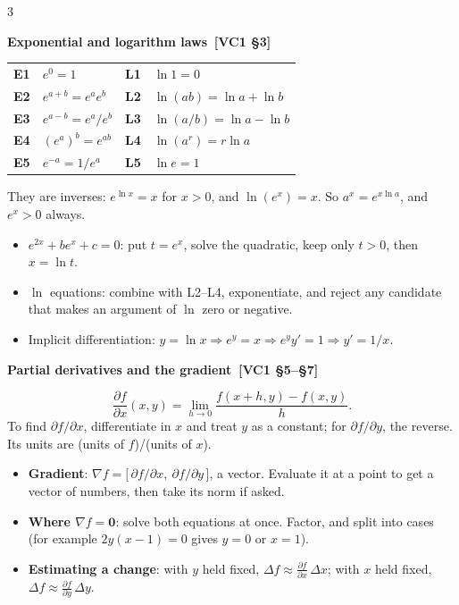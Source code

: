 \documentclass[8pt]{extarticle}
\newcommand{\sub}[1]{\par\vspace{3pt}\noindent
  {\color{RoyalBlue}\bfseries\sffamily #1}\par\vspace{0.5pt}}
\newcommand{\src}[1]{{\color{gray}\,[#1]}}
\newcommand{\vc}[1]{\mathbf{#1}}
\newcommand{\grad}{\nabla}
\newcommand{\pd}[2]{\frac{\partial #1}{\partial #2}}
\begin{document}
\begin{multicols*}{3}
\sub{Exponential and logarithm laws \src{VC1 \S3}}
\begin{tabular}{@{}l l @{\quad} l l@{}}
\textbf{E1} & $e^{0}=1$ & \textbf{L1} & $\ln1=0$ \\
\textbf{E2} & $e^{a+b}=e^{a}e^{b}$ & \textbf{L2} & $\ln(ab)=\ln a+\ln b$ \\
\textbf{E3} & $e^{a-b}=e^{a}/e^{b}$ & \textbf{L3} & $\ln(a/b)=\ln a-\ln b$ \\
\textbf{E4} & $(e^{a})^{b}=e^{ab}$ & \textbf{L4} & $\ln(a^{r})=r\ln a$ \\
\textbf{E5} & $e^{-a}=1/e^{a}$ & \textbf{L5} & $\ln e=1$ \\
\end{tabular}

\smallskip
They are inverses: $e^{\ln x}=x$ for $x>0$, and $\ln(e^{x})=x$. So
$a^{x}=e^{x\ln a}$, and $e^{x}>0$ always.
\begin{itemize}
  \item $e^{2x}+be^{x}+c=0$: put $t=e^{x}$, solve the quadratic, keep only
        $t>0$, then $x=\ln t$.
  \item $\ln$ equations: combine with L2--L4, exponentiate, and reject any
        candidate that makes an argument of $\ln$ zero or negative.
  \item Implicit differentiation: $y=\ln x\Rightarrow e^{y}=x\Rightarrow
        e^{y}y'=1\Rightarrow y'=1/x$.
\end{itemize}

\columnbreak
\sub{Partial derivatives and the gradient \src{VC1 \S5--\S7}}
\[
  \pd fx(x,y)=\lim_{h\to0}\frac{f(x+h,y)-f(x,y)}{h} .
\]
To find $\partial f/\partial x$, differentiate in $x$ and treat $y$ as a
constant; for $\partial f/\partial y$, the reverse. Its units are
(units of $f$)/(units of $x$).
\begin{itemize}
  \item \textbf{Gradient}: $\grad f=\bigl[\,\partial f/\partial x,\
        \partial f/\partial y\,\bigr]$, a vector. Evaluate it at a point to
        get a vector of numbers, then take its norm if asked.
  \item \textbf{Where $\grad f=\vc{0}$}: solve both equations at once. Factor,
        and split into cases (for example $2y(x-1)=0$ gives $y=0$ or $x=1$).
  \item \textbf{Estimating a change}: with $y$ held fixed,
        $\Delta f\approx\pd fx\,\Delta x$; with $x$ held fixed,
        $\Delta f\approx\pd fy\,\Delta y$.
\end{itemize}


\end{multicols*}
\end{document}
